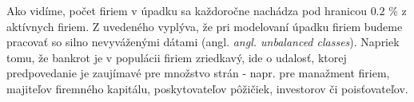 Ako vidíme, počet firiem v úpadku sa každoročne nachádza pod hranicou \(0.2\) \% z aktívnych firiem.
Z uvedeného vyplýva, že pri modelovaní úpadku firiem budeme pracovať so silno nevyváženými dátami (angl. \emph{angl. unbalanced classes}).
Napriek tomu, že bankrot je v populácii firiem zriedkavý, ide o udalosť, ktorej predpovedanie je zaujímavé pre množstvo strán -
napr. pre manažment firiem, majiteľov firemného kapitálu, poskytovateľov pôžičiek, investorov či poisťovateľov.